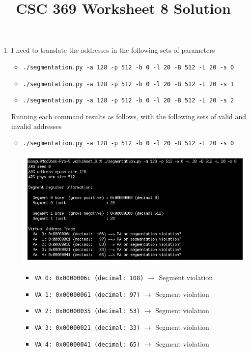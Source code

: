 \documentclass[12pt]{article}
\begin{document}
\title{CSC 369 Worksheet 8 Solution}

\maketitle

\bigskip

\begin{enumerate}[1.]
    \item

    \bigskip

    I need to translate the addresses in the following sets of parameters

    \begin{itemize}
        \item \texttt{./segmentation.py -a 128 -p 512 -b 0 -l 20 -B 512 -L 20 -s 0}
        \item \texttt{./segmentation.py -a 128 -p 512 -b 0 -l 20 -B 512 -L 20 -s 1}
        \item \texttt{./segmentation.py -a 128 -p 512 -b 0 -l 20 -B 512 -L 20 -s 2}
    \end{itemize}

    \bigskip

    Running each command results as follows, with the following sets of valid and invalid
    addresses

    \bigskip

    \begin{itemize}
        \item \texttt{./segmentation.py -a 128 -p 512 -b 0 -l 20 -B 512 -L 20 -s 0}

        \begin{center}
        \includegraphics[width=0.8\linewidth]{images/worksheet_8_solution_3.png}
        \end{center}

        \begin{itemize}
            \item \texttt{VA  0: 0x0000006c (decimal:  108)} $\to$ Segment violation
            \item \texttt{VA  1: 0x00000061 (decimal:   97)} $\to$ Segment violation
            \item \texttt{VA  2: 0x00000035 (decimal:   53)} $\to$ Segment violation
            \item \texttt{VA  3: 0x00000021 (decimal:   33)} $\to$ Segment violation
            \item \texttt{VA  4: 0x00000041 (decimal:   65)} $\to$ Segment violation
        \end{itemize}


\end{itemize}
\end{enumerate}
\end{document}
